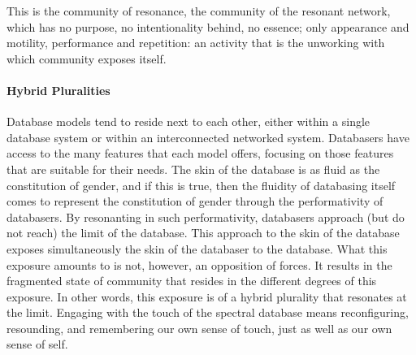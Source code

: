This is the community of resonance, the community of the resonant network, which has no purpose, no intentionality behind, no essence; only appearance and motility, performance and repetition: an activity that is 
the unworking with which community exposes itself. 

\paragraph{Hybrid Pluralities}
Database models tend to reside next to each other, either within a single database system or within an interconnected networked system. Databasers have access to the many features that each model offers, focusing on those features that are suitable for their needs.  The skin of the database is as fluid as the constitution of gender, and if this is true, then the fluidity of databasing itself comes to represent the constitution of gender through the performativity of databasers. By resonanting in such performativity, databasers approach (but do not reach) the limit of the database. This approach to the skin of the database exposes simultaneously 
the skin of the databaser to the database. 
%
What this exposure amounts to is not, however, an opposition of forces. It results in the fragmented state of community that resides in the different degrees of this exposure. In other words, this exposure is of a hybrid plurality that resonates at the limit. Engaging with the touch of the spectral database means reconfiguring, resounding, and remembering our own sense of touch, just as well as our own sense of self.